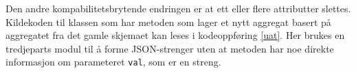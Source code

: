 Den andre kompabilitetsbrytende endringen er at ett eller flere attributter slettes. Kildekoden til klassen som har metoden som lager et nytt aggregat basert på aggregatet fra det gamle skjemaet kan leses i kodeoppføring \ref{uat}. Her brukes en tredjeparts modul til å forme JSON-strenger uten at metoden har noe direkte informasjon om parameteret \texttt{val}, som er en streng.

\newpage


